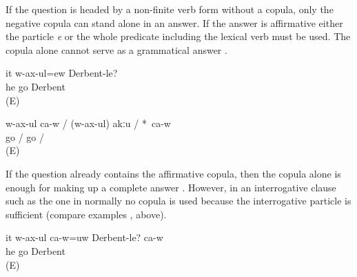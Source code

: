 If the question is headed by a non-finite verb form without a copula, only the negative copula can stand alone in an answer. If the answer is affirmative either the particle \textit{e}  or the whole predicate including the lexical verb must be used. The copula alone cannot serve as a grammatical answer .
%
\begin{exe}
	\ex	\label{ex:Is he going to Derbent}
	\gll	it	w-ax-ul=ew	Derbent-le?\\
		he	go	Derbent\\
	\glt	{} (E)

	\ex	\label{ex:He is going / not going}
	\gll	w-ax-ul		ca-w	/	(w-ax-ul)		akːu		/	*~ca-w\\
		go		/	go		/	{\hphantom{*}}~\\
	\glt	{} (E)
\end{exe}

If the question already contains the affirmative copula, then the copula alone is enough for making up a complete answer . However, in an interrogative clause such as the one in  normally no copula is used because the interrogative particle is sufficient (compare examples ,  above).
%
\begin{exe}
	\ex	\label{ex:Is he going to Derbent? Yes, he is}
	\gll	it	w-ax-ul	ca-w=uw	Derbent-le?	ca-w\\
		he	go		Derbent	\\
	\glt	{} (E)
\end{exe}

